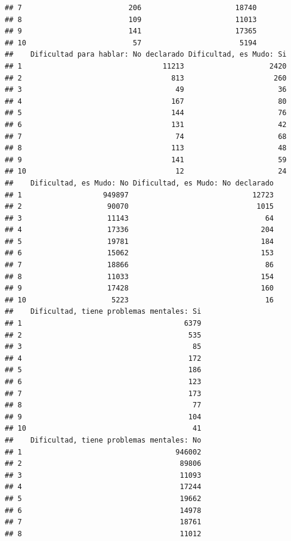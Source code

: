 \documentclass[11pt,]{article}
\begin{document}
\begin{verbatim}
## 7                         206                      18740
## 8                         109                      11013
## 9                         141                      17365
## 10                         57                       5194
##    Dificultad para hablar: No declarado Dificultad, es Mudo: Si
## 1                                 11213                    2420
## 2                                   813                     260
## 3                                    49                      36
## 4                                   167                      80
## 5                                   144                      76
## 6                                   131                      42
## 7                                    74                      68
## 8                                   113                      48
## 9                                   141                      59
## 10                                   12                      24
##    Dificultad, es Mudo: No Dificultad, es Mudo: No declarado
## 1                   949897                             12723
## 2                    90070                              1015
## 3                    11143                                64
## 4                    17336                               204
## 5                    19781                               184
## 6                    15062                               153
## 7                    18866                                86
## 8                    11033                               154
## 9                    17428                               160
## 10                    5223                                16
##    Dificultad, tiene problemas mentales: Si
## 1                                      6379
## 2                                       535
## 3                                        85
## 4                                       172
## 5                                       186
## 6                                       123
## 7                                       173
## 8                                        77
## 9                                       104
## 10                                       41
##    Dificultad, tiene problemas mentales: No
## 1                                    946002
## 2                                     89806
## 3                                     11093
## 4                                     17244
## 5                                     19662
## 6                                     14978
## 7                                     18761
## 8                                     11012

\end{verbatim}
\end{document}
